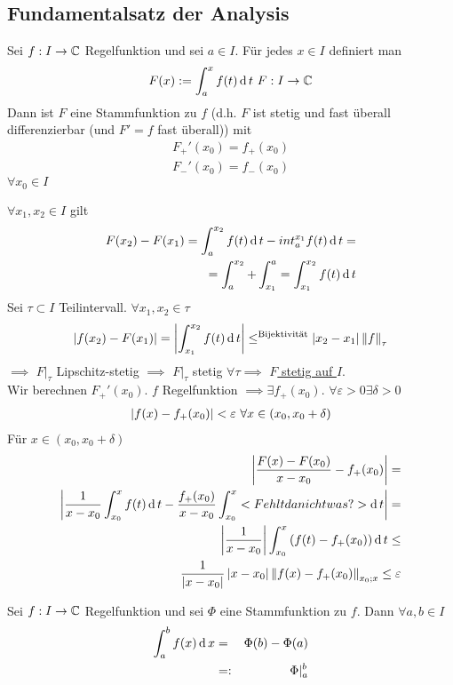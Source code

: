 \subsection{Fundamentalsatz der Analysis}
\begin{Sat}
  Sei $f:I\to\mathbb{C}$ Regelfunktion und sei $a\in I$. Für jedes $x\in I$ definiert man
  \[F(x):=\int_a^x f(t)\md t\ F:I\to\mb{C}\]
  Dann ist $F$ eine Stammfunktion zu $f$ (d.h. $F$ ist stetig und fast überall differenzierbar (und $F'=f$ fast überall)) mit
  \begin{align*}
    F_+'(x_0)=f_+(x_0)\\
    F_-'(x_0)=f_-(x_0)
  \end{align*}
  $\forall x_0 \in I$
\end{Sat}
\begin{Bew}
  $\forall x_1,x_2\in I$ gilt
  \begin{align*}
    F(x_2)-F(x_1)=\int_a^{x_2}f(t)\operatorname{d} t-int^{x_1}_a f(t)\operatorname{d} t =\\
    =\int^{x_2}_a+\int^a_{x_1}= \int^{x_2}_{x_1}f(t)\operatorname{d} t    
  \end{align*}
  Sei $\tau\subset I$ Teilintervall. $\forall x_1, x_2\in \tau$
  \begin{align*}
    \left| f(x_2)-F(x_1) \right|=\left| \int^{x_2}_{x_1}f(t)\operatorname{d} t \right|\leq^{\text{Bijektivität}} \left| x_2-x_1 \right|\left\| f \right\|_\tau
  \end{align*}
  $\implies$ $F|_\tau$ Lipschitz-stetig $\implies$ $F|_\tau$ stetig $\forall \tau \implies$ \underline{$F$ stetig auf $I$}.\\
  Wir berechnen $F_+'(x_0)$. $f$ Regelfunktion $\implies \exists f_+(x_0)$. $\forall \varepsilon>0 \exists \delta >0$
  \begin{align*}
    \left| f(x)-f_+(x_0) \right|<\varepsilon\ \forall x\in(x_0, x_0+\delta)\\
  \end{align*}
  Für $x\in (x_0, x_0+\delta)$
  \begin{align*}
    \left|  \frac{F(x)-F(x_0)}{x-x_0} -f_+(x_0)  \right| = \\ \left|  \frac{1}{x-x_0} \int_{x_0}^x f(t)\operatorname{d} t-\frac{f_+(x_0)}{x-x_0} \int_{x_0}^x <Fehlt da nicht was?> \operatorname{d} t \right| = \\
    \left| \frac{1}{x-x_0} \right|\int_{x_0}^x\left( f(t)-f_+(x_0) \right)\operatorname{d} t \leq\\
    \frac{1}{\left| x-x_0 \right|}\left| x-x_0 \right|\left\| f(x)-f_+(x_0) \right\|_{x_0;x} \leq \varepsilon
  \end{align*}
\end{Bew}
\begin{Kor}
  Sei $f:I\to\mathbb{C}$ Regelfunktion und sei $\Phi$ eine Stammfunktion zu $f$. Dann $\forall a,b\in I$
  \begin{align*}
    \int^b_af(x)\operatorname{d} x&=&\Phi(b)-\Phi(a)\\
    &=:&\Phi|^b_a
  \end{align*}
\end{Kor}
